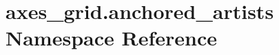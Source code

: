 \hypertarget{namespaceaxes__grid_1_1anchored__artists}{}\section{axes\+\_\+grid.\+anchored\+\_\+artists Namespace Reference}
\label{namespaceaxes__grid_1_1anchored__artists}
